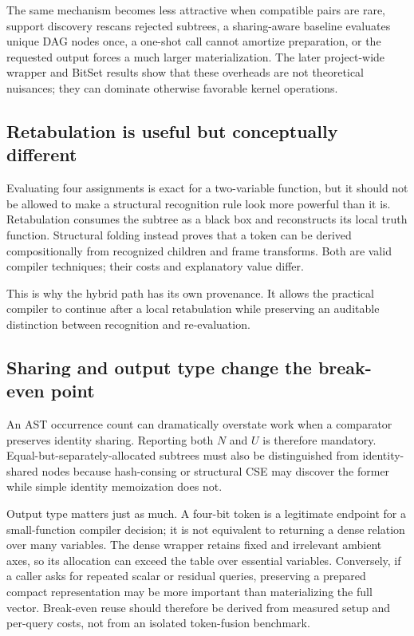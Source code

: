 \documentclass[10pt]{article}
\theoremstyle{plain}
\theoremstyle{definition}
\theoremstyle{remark}
\begin{document}
The same mechanism becomes less attractive when compatible pairs are rare, support discovery rescans rejected subtrees, a sharing-aware baseline evaluates unique DAG nodes once, a one-shot call cannot amortize preparation, or the requested output forces a much larger materialization. The later project-wide wrapper and BitSet results show that these overheads are not theoretical nuisances; they can dominate otherwise favorable kernel operations.

\subsection{Retabulation is useful but conceptually different}

Evaluating four assignments is exact for a two-variable function, but it should not be allowed to make a structural recognition rule look more powerful than it is. Retabulation consumes the subtree as a black box and reconstructs its local truth function. Structural folding instead proves that a token can be derived compositionally from recognized children and frame transforms. Both are valid compiler techniques; their costs and explanatory value differ.

This is why the hybrid path has its own provenance. It allows the practical compiler to continue after a local retabulation while preserving an auditable distinction between recognition and re-evaluation.

\subsection{Sharing and output type change the break-even point}

An AST occurrence count can dramatically overstate work when a comparator preserves identity sharing. Reporting both $N$ and $U$ is therefore mandatory. Equal-but-separately-allocated subtrees must also be distinguished from identity-shared nodes because hash-consing or structural CSE may discover the former while simple identity memoization does not.

Output type matters just as much. A four-bit token is a legitimate endpoint for a small-function compiler decision; it is not equivalent to returning a dense relation over many variables. The dense wrapper retains fixed and irrelevant ambient axes, so its allocation can exceed the table over essential variables. Conversely, if a caller asks for repeated scalar or residual queries, preserving a prepared compact representation may be more important than materializing the full vector. Break-even reuse should therefore be derived from measured setup and per-query costs, not from an isolated token-fusion benchmark.
\end{document}
